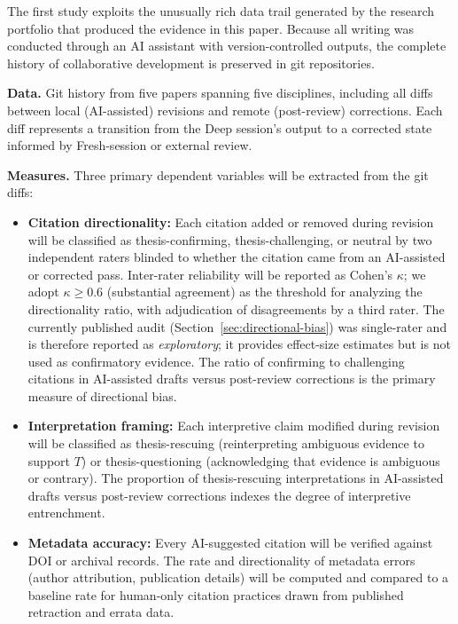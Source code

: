 \documentclass[12pt]{article}
\begin{document}
The first study exploits the unusually rich data trail generated by the research portfolio that produced the evidence in this paper. Because all writing was conducted through an AI assistant with version-controlled outputs, the complete history of collaborative development is preserved in git repositories.

\textbf{Data.} Git history from five papers spanning five disciplines, including all diffs between local (AI-assisted) revisions and remote (post-review) corrections. Each diff represents a transition from the Deep session's output to a corrected state informed by Fresh-session or external review.

\textbf{Measures.} Three primary dependent variables will be extracted from the git diffs:
\begin{itemize}
    \item \textbf{Citation directionality:} Each citation added or removed during revision will be classified as thesis-confirming, thesis-challenging, or neutral by two independent raters blinded to whether the citation came from an AI-assisted or corrected pass. Inter-rater reliability will be reported as Cohen's $\kappa$; we adopt $\kappa \geq 0.6$ (substantial agreement) as the threshold for analyzing the directionality ratio, with adjudication of disagreements by a third rater. The currently published audit (Section~\ref{sec:directional-bias}) was single-rater and is therefore reported as \emph{exploratory}; it provides effect-size estimates but is not used as confirmatory evidence. The ratio of confirming to challenging citations in AI-assisted drafts versus post-review corrections is the primary measure of directional bias.
    \item \textbf{Interpretation framing:} Each interpretive claim modified during revision will be classified as thesis-rescuing (reinterpreting ambiguous evidence to support $T$) or thesis-questioning (acknowledging that evidence is ambiguous or contrary). The proportion of thesis-rescuing interpretations in AI-assisted drafts versus post-review corrections indexes the degree of interpretive entrenchment.
    \item \textbf{Metadata accuracy:} Every AI-suggested citation will be verified against DOI or archival records. The rate and directionality of metadata errors (author attribution, publication details) will be computed and compared to a baseline rate for human-only citation practices drawn from published retraction and errata data.
\end{itemize}
\end{document}
